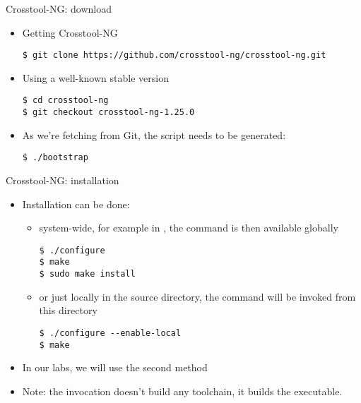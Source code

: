 \begin{frame}[fragile]{Crosstool-NG: download}
  \begin{itemize}
  \item Getting Crosstool-NG
\begin{verbatim}
$ git clone https://github.com/crosstool-ng/crosstool-ng.git
\end{verbatim}
  \item Using a well-known stable version
\begin{verbatim}
$ cd crosstool-ng
$ git checkout crosstool-ng-1.25.0
\end{verbatim}
  \item As we're fetching from Git, the  script needs
    to be generated:
\begin{verbatim}
$ ./bootstrap
\end{verbatim}
  \end{itemize}
\end{frame}

\begin{frame}[fragile]{Crosstool-NG: installation}
  \begin{itemize}
  \item Installation can be done:
    \begin{itemize}
    \item system-wide, for example in , the
       command is then available globally
\begin{verbatim}
$ ./configure
$ make
$ sudo make install
\end{verbatim}
    \item or just locally in the source directory, the 
      command will be invoked from this directory
\begin{verbatim}
$ ./configure --enable-local
$ make
\end{verbatim}
    \end{itemize}
  \item In our labs, we will use the second method
  \item Note: the  invocation doesn't build any toolchain,
    it builds the  executable.
  \end{itemize}
\end{frame}

